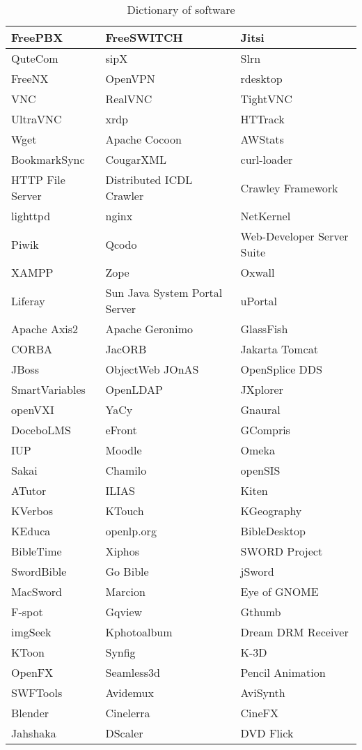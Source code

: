 \begin{table}
\begin{center}
\begin{tabular}{|l|l|l|}\hline
FreePBX&FreeSWITCH&Jitsi\\\hline
QuteCom&sipX&Slrn\\\hline
FreeNX&OpenVPN&rdesktop\\\hline
VNC&RealVNC&TightVNC\\\hline
UltraVNC&xrdp&HTTrack\\\hline
Wget&Apache Cocoon&AWStats\\\hline
BookmarkSync&CougarXML&curl-loader\\\hline
HTTP File Server&Distributed ICDL Crawler&Crawley Framework\\\hline
lighttpd&nginx&NetKernel\\\hline
Piwik&Qcodo&Web-Developer Server Suite\\\hline
XAMPP&Zope&Oxwall\\\hline
Liferay&Sun Java System Portal Server&uPortal\\\hline
Apache Axis2&Apache Geronimo&GlassFish\\\hline
CORBA&JacORB&Jakarta Tomcat\\\hline
JBoss&ObjectWeb JOnAS&OpenSplice DDS\\\hline
SmartVariables&OpenLDAP&JXplorer\\\hline
openVXI&YaCy&Gnaural\\\hline
DoceboLMS&eFront&GCompris\\\hline
IUP&Moodle&Omeka\\\hline
Sakai&Chamilo&openSIS\\\hline
ATutor&ILIAS&Kiten\\\hline
KVerbos&KTouch&KGeography\\\hline
KEduca&openlp.org&BibleDesktop\\\hline
BibleTime&Xiphos&SWORD Project\\\hline
SwordBible&Go Bible&jSword\\\hline
MacSword&Marcion&Eye of GNOME\\\hline
F-spot&Gqview&Gthumb\\\hline
imgSeek&Kphotoalbum&Dream DRM Receiver\\\hline
KToon&Synfig&K-3D\\\hline
OpenFX&Seamless3d&Pencil Animation\\\hline
SWFTools&Avidemux&AviSynth\\\hline
Blender&Cinelerra&CineFX\\\hline
Jahshaka&DScaler&DVD Flick\\\hline
\end{tabular}
\end{center}
\caption{Dictionary of software}
\end{table}

